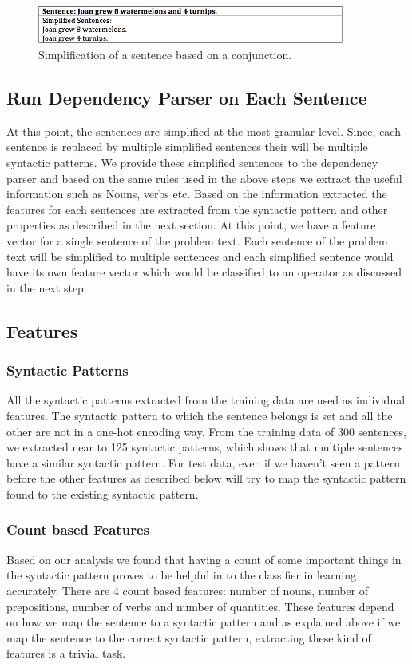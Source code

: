 \documentclass[11pt]{article}
\begin{document}
\begin{figure}[h!]
\includegraphics[width=0.90\textwidth]{Figure4}
\centering
\caption{\label{fig:Figure4}Simplification of a sentence based on a conjunction.}
\end{figure}

\subsection{Run Dependency Parser on Each Sentence}
At this point, the sentences are simplified at the most granular level. Since, each sentence is replaced by multiple simplified sentences their will be multiple syntactic patterns. We provide these simplified sentences to the dependency parser and based on the same rules used in the above steps we extract the useful information such as Nouns, verbs etc. Based on the information extracted the features for each sentences are extracted from the syntactic pattern and other properties as described in the next section. At this point, we have a feature vector for a single sentence of the problem text. Each sentence of the problem text will be simplified to multiple sentences and each simplified sentence would have its own feature vector which would be classified to an operator as discussed in the next step.

\subsection{Features} 
\subsubsection{Syntactic Patterns}
All the syntactic patterns extracted from the training data are used as individual features. The syntactic pattern to which the sentence belongs is set and all the other are not in a one-hot encoding way. From the training data of 300 sentences, we extracted near to 125 syntactic patterns, which shows that multiple sentences have a similar syntactic pattern. For test data, even if we haven't seen a pattern before the other features as described below will try to map the syntactic pattern found to the existing syntactic pattern. 

\subsubsection{Count based Features}
Based on our analysis we found that having a count of some important things in the syntactic pattern proves to be helpful in to the classifier in learning accurately. There are 4 count based features: number of nouns, number of prepositions, number of verbs and number of quantities. These features depend on how we map the sentence to a syntactic pattern and as explained above if we map the sentence to the correct syntactic pattern, extracting these kind of features is a trivial task.
\end{document}
